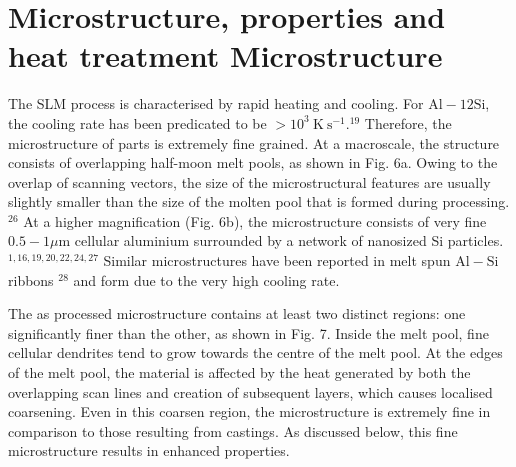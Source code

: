 \documentclass[10pt]{article}
\begin{document}
\section*{Microstructure, properties and heat treatment Microstructure}
The SLM process is characterised by rapid heating and cooling. For $\mathrm{Al}-12 \mathrm{Si}$, the cooling rate has been predicated to be $>10^{3} \mathrm{~K} \mathrm{~s}^{-1} .{ }^{19}$ Therefore, the microstructure of parts is extremely fine grained. At a macroscale, the structure consists of overlapping half-moon melt pools, as shown in Fig. 6a. Owing to the overlap of scanning vectors, the size of the microstructural features are usually slightly smaller than the size of the molten pool that is formed during processing. ${ }^{26}$ At a higher magnification (Fig. 6b), the microstructure consists of very fine $0.5-1 \mu \mathrm{m}$ cellular aluminium surrounded by a network of nanosized Si particles. ${ }^{1,16,19,20,22,24,27}$ Similar microstructures have been reported in melt spun $\mathrm{Al}-\mathrm{Si}$ ribbons $^{28}$ and form due to the very high cooling rate.

The as processed microstructure contains at least two distinct regions: one significantly finer than the other, as shown in Fig. 7. Inside the melt pool, fine cellular dendrites tend to grow towards the centre of the melt pool. At the edges of the melt pool, the material is affected by the heat generated by both the overlapping scan lines and creation of subsequent layers, which causes localised coarsening. Even in this coarsen region, the microstructure is extremely fine in comparison to those resulting from castings. As discussed below, this fine microstructure results in enhanced properties.
\end{document}
